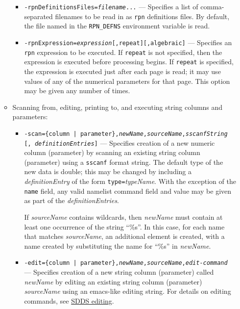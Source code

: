 \begin{itemize}
\begin{itemize}
        \begin{itemize} \item {\tt -rpnDefinitionsFiles={\em filename}...} --- Specifies a list of comma-separated
filenames to be read in as \verb|rpn| definitions files.  By default, the file named in the {\tt RPN\_DEFNS}
environment variable is read.

        \item {\tt -rpnExpression={\em expression}[,repeat][,algebraic]} --- Specifies an \verb|rpn| expression to be executed.  If
{\tt repeat} is not specified, then the expression is executed before processing begins.  If {\tt repeat} is specified,
the expression is executed just after each page is read; it may use values of any of the numerical parameters for that
page. This option may be given any number of times.

        \end{itemize}
  \item Scanning from, editing, printing to, and executing string columns and parameters: \\

         \begin{itemize}
 
         \item {\tt -scan=\{column | parameter\},{\em newName},{\em sourceName},{\em sscanfString}}\\ {\tt [,{\em
 definitionEntries}]} --- Specifies creation of a new numeric column (parameter) by scanning an existing string column
 (parameter) using a \verb|sscanf| format string.  The default type of the new data is double; this may be changed by
 including a {\em definitionEntry} of the form {\tt type=}{\em typeName}.  With the exception of the {\tt name} field,
 any valid namelist command field and value may be given as part of the {\em definitionEntries}.

        If {\em sourceName} contains wildcards, then {\em newName} must contain at least one occurrence of the string
``\%s''.  In this case, for each name that matches {\em sourceName}, an additional element is created, with a
name created by substituting the name for ``\%s'' in {\em newName}.
 
         \item {\tt -edit=\{column | parameter\},{\em newName},{\em sourceName},{\em edit-command}} --- Specifies
creation of a new string column (parameter) called {\em newName} by editing an existing string column (parameter) {\em
sourceName} using an emacs-like editing string.  For details on editing commands, see \hyperref[SDDSediting]{SDDS editing}.
         

\end{itemize}
\end{itemize}
\end{itemize}
